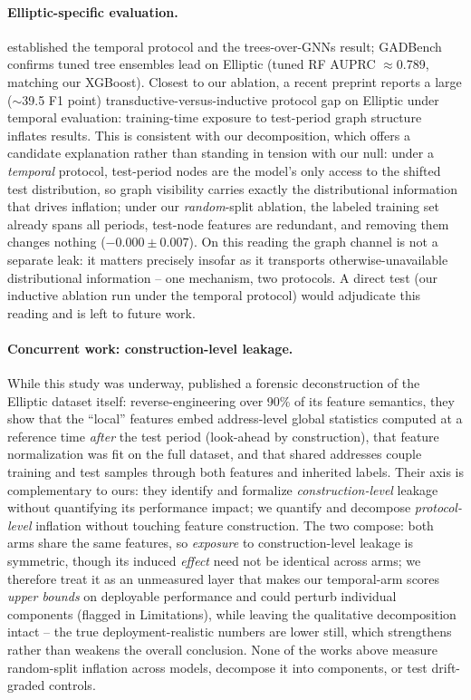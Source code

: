 \documentclass[11pt]{article}
\begin{document}
\paragraph{Elliptic-specific evaluation.} \citet{weber2019aml} established the
temporal protocol and the trees-over-GNNs result; GADBench \citep{tang2023gadbench}
confirms tuned tree ensembles lead on Elliptic (tuned RF AUPRC $\approx$0.789,
matching our XGBoost). Closest to our ablation, a recent preprint
\citep{maganti2026liability} reports a large ($\sim$39.5 F1 point)
transductive-versus-inductive protocol gap on Elliptic under temporal evaluation:
training-time exposure to test-period graph structure inflates results. This is
consistent with our decomposition, which offers a candidate explanation rather
than standing in tension with our null: under a \emph{temporal} protocol, test-period nodes are the model's only
access to the shifted test distribution, so graph visibility carries exactly the
distributional information that drives inflation; under our \emph{random}-split
ablation, the labeled training set already spans all periods, test-node features
are redundant, and removing them changes nothing ($-0.000\pm0.007$). On this
reading the graph channel is not a separate leak: it matters precisely insofar as
it transports otherwise-unavailable distributional information -- one mechanism,
two protocols. A direct test (our inductive ablation run under the temporal
protocol) would adjudicate this reading and is left to future work.

\paragraph{Concurrent work: construction-level leakage.} While this study was
underway, \citet{safar2026opacity} published a forensic deconstruction of the
Elliptic dataset itself: reverse-engineering over 90\% of its feature semantics,
they show that the ``local'' features embed address-level global statistics
computed at a reference time \emph{after} the test period (look-ahead by
construction), that feature normalization was fit on the full dataset, and that
shared addresses couple training and test samples through both features and
inherited labels. Their axis is complementary to ours: they identify and formalize
\emph{construction-level} leakage without quantifying its performance impact; we
quantify and decompose \emph{protocol-level} inflation without touching feature
construction. The two compose: both arms share the same features, so \emph{exposure} to
construction-level leakage is symmetric, though its induced \emph{effect} need
not be identical across arms; we therefore treat it as an unmeasured layer that
makes our temporal-arm scores \emph{upper bounds} on deployable performance and
could perturb individual components (flagged in Limitations), while leaving the
qualitative decomposition intact -- the true deployment-realistic numbers are
lower still, which strengthens rather than weakens the overall conclusion. None of the works above
measure random-split inflation across models, decompose it into components, or
test drift-graded controls.
\end{document}
